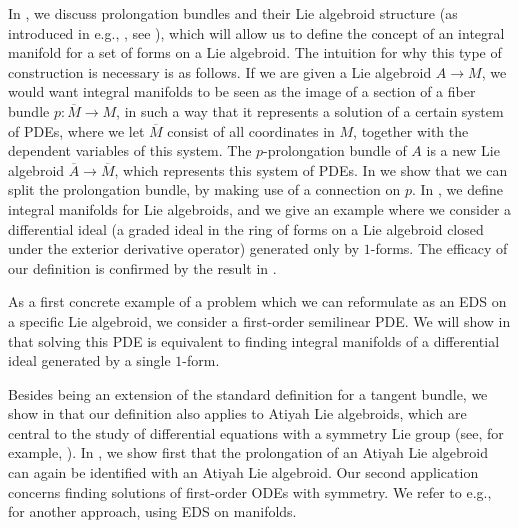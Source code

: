 \documentclass[11pt]{article}
\theoremstyle{plain}
\theoremstyle{definition}
\begin{document}
 
In , we discuss prolongation bundles and their Lie algebroid structure (as introduced in e.g., \cite{Higgins,martinez2001lagrangeliealgebroid, martinez2002prolongation}, see ), which will allow us to define the concept of an integral manifold for a set of forms on a Lie algebroid. The intuition for why this type of construction is necessary is as follows. If we are given a Lie algebroid $A\to M$, we would want integral manifolds to be seen as the image of a section of a fiber bundle $p\colon \overline{M}\to M$, in such a way that it represents a solution of a certain system of PDEs, where we let $\overline{M}$ consist of all coordinates in $M$, together with the dependent variables of this system. The $p$-prolongation bundle of $A$ is a new Lie algebroid $\overline{A}\to \overline{M}$, which represents this system of PDEs.  In  we show that we can split the prolongation bundle, by making use of a connection on $p$. In , we define integral manifolds for Lie algebroids, and we give an example where we consider a differential ideal (a graded ideal in the ring of forms on a Lie algebroid closed under the exterior derivative operator) generated only by $1$-forms. The efficacy of our definition is confirmed by the result in .

As a first concrete example of a problem which we can reformulate as an EDS on a specific Lie algebroid, we consider a first-order semilinear PDE. We will show in  that solving this PDE is equivalent to finding integral manifolds of a differential ideal generated by a single $1$-form. 

Besides being an extension of the standard definition for a tangent bundle, we show in  that our definition also applies to Atiyah Lie algebroids, which are central to the study of  differential equations with a  symmetry Lie group (see, for example, \cite{barbero2016invproblemliealgebroids, firstorderrec,deleon2005survey,Educontrol}).  In , we show first that the prolongation of an Atiyah Lie algebroid can again be identified with an Atiyah Lie algebroid. Our second application concerns finding solutions of first-order ODEs with symmetry.  We refer to e.g., \cite{fels2007edssymmetry,fels2008edssymmetry} for another approach, using EDS on manifolds.
\end{document}
